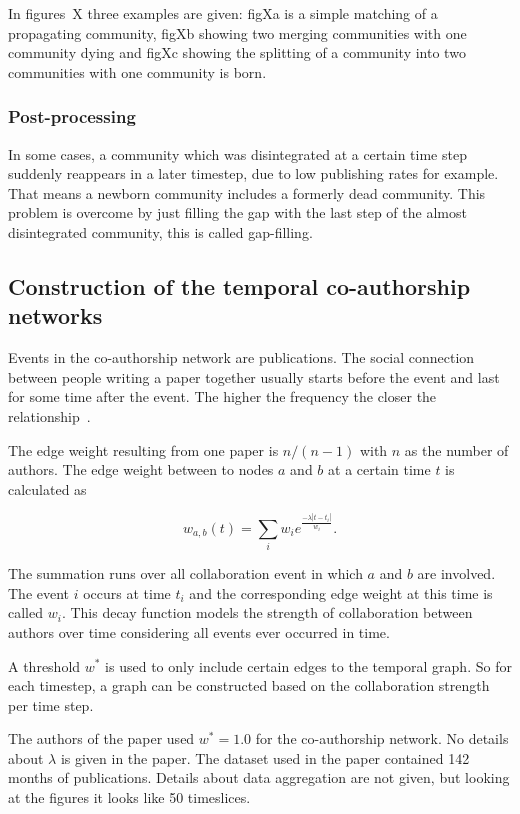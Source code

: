 \documentclass[runningheads,a4paper]{llncs}
\begin{document}
In figures~X three examples are given: figXa is a simple matching of a propagating community, figXb showing two merging communities with one community dying and figXc showing the splitting of a community into two communities with one community is born.

\subsubsection{Post-processing}
In some cases, a community which was disintegrated at a certain time step suddenly reappears in a later timestep, due to low publishing rates for example.
That means a newborn community includes a formerly dead community.
This problem is overcome by just filling the gap with the last step of the almost disintegrated community, this is called gap-filling.

\subsection{Construction of the temporal co-authorship networks}
\label{evolution-constr}
Events in the co-authorship network are publications.
The social connection between people writing a paper together usually starts before the event and last for some time after the event. The higher the frequency the closer the relationship~\cite{ramasco2006social}.

The edge weight resulting from one paper is $n/(n-1)$ with $n$ as the number of authors. The edge weight between to nodes $a$ and $b$ at a certain time $t$ is calculated as

$$w_{a,b}(t)= \sum_{i}^{} w_i e^{\frac{-\lambda \left|t-t_i\right|}{w_i}}.$$

The summation runs over all collaboration event in which $a$ and $b$ are involved. The event $i$ occurs at time $t_i$ and the corresponding edge weight at this time is called $w_i$. This decay function models the strength of collaboration between authors over time considering all events ever occurred in time.

A threshold $w^*$ is used to only include certain edges to the temporal graph. So for each timestep, a graph can be constructed based on the collaboration strength per time step.

The authors of the paper used $w^*=1.0$ for the co-authorship network.
No details about $\lambda$ is given in the paper.
The dataset used in the paper contained 142 months of publications. Details about data aggregation are not given, but looking at the figures it looks like 50 timeslices.
\end{document}

